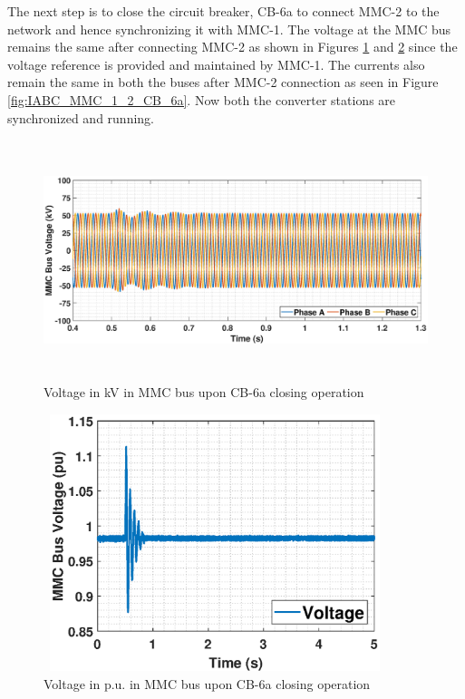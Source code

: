 The next step is to close the circuit breaker, CB-6a to connect \gls{MMC}-2 to the network and hence synchronizing it with \gls{MMC}-1.   The voltage at the \gls{MMC} bus remains the same after connecting \gls{MMC}-2 as shown in Figures \ref{fig:VABC_MMC_1_2_CB_6a} and \ref{fig:VACP_MMC_1_2_CB_6a} since the voltage reference is provided and maintained by \gls{MMC}-1. The currents also remain the same in both the buses after \gls{MMC}-2 connection as seen in Figure \ref{fig:IABC_MMC_1_2_CB_6a}. Now both the converter stations are synchronized and running.


\begin{figure}[H]
\hspace*{-1.2cm}
    \includegraphics[height = 7cm,width = 18.5cm]{Diagrams/Chapter_5/VABC_MMC_1_2_CB_6a.eps}
    \caption{Voltage in kV in MMC bus upon CB-6a closing operation}
    \label{fig:VABC_MMC_1_2_CB_6a}
\end{figure}

\begin{figure}[H]
\centering
    \includegraphics[height = 7.5cm,width = 10cm]{Diagrams/Chapter_5/VACP_MMC_1_2_CB_6a.eps}
    \caption{Voltage in p.u. in MMC bus upon CB-6a closing operation}
    \label{fig:VACP_MMC_1_2_CB_6a}
\end{figure}


